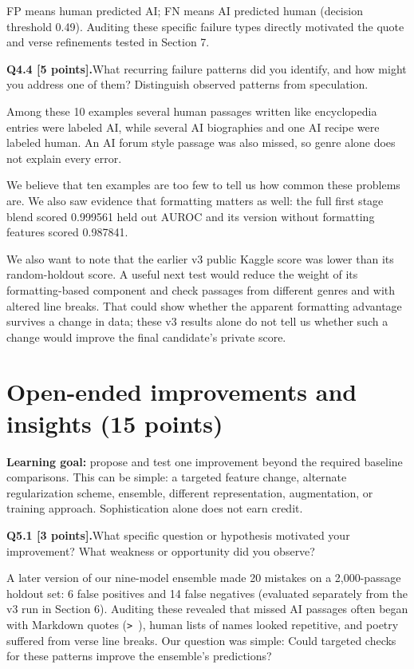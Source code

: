 \documentclass[11pt,letterpaper]{article}
\newcommand{\question}[2]{\needspace{4\baselineskip}\par\addvspace{0.45em}\noindent\textbf{#1}\quad #2\par\nobreak\vspace{0.1em}}
\newcommand{\smallnote}[1]{{\small\color{muted}#1}}
\begin{document}
\smallnote{FP means human predicted AI; FN means AI predicted human (decision threshold 0.49). Auditing these specific failure types directly motivated the quote and verse refinements tested in Section 7.}
\question{Q4.4 [5 points].}{What recurring failure patterns did you identify, and how might you address one of them? Distinguish observed patterns from speculation.}
Among these 10 examples several human passages written like encyclopedia entries were labeled AI, while several AI biographies and one AI recipe were labeled human. An AI forum style passage was also missed, so genre alone does not explain every error.

We believe that ten examples are too few to tell us how common these problems are. We also saw evidence that formatting matters as well: the full first stage blend scored 0.999561 held out AUROC and its version without formatting features scored 0.987841.

We also want to note that the earlier v3 public Kaggle score was lower than its random-holdout score. A useful next test would reduce the weight of its formatting-based component and check passages from different genres and with altered line breaks. That could show whether the apparent formatting advantage survives a change in data; these v3 results alone do not tell us whether such a change would improve the final candidate's private score.
\newpage
\section{Open-ended improvements and insights (15 points)}
\textbf{Learning goal:} propose and test one improvement beyond the required baseline comparisons. This can be simple: a targeted feature change, alternate regularization scheme, ensemble, different representation, augmentation, or training approach. Sophistication alone does not earn credit.

\question{Q5.1 [3 points].}{What specific question or hypothesis motivated your improvement? What weakness or opportunity did you observe?}
A later version of our nine-model ensemble made 20 mistakes on a 2,000-passage holdout set: 6 false positives and 14 false negatives (evaluated separately from the v3 run in Section 6). Auditing these revealed that missed AI passages often began with Markdown quotes (\texttt{> }), human lists of names looked repetitive, and poetry suffered from verse line breaks. Our question was simple: Could targeted checks for these patterns improve the ensemble's predictions?
\end{document}

